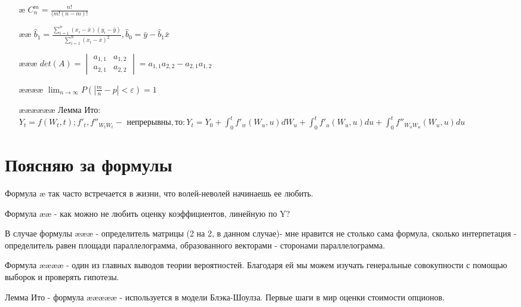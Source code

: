 \documentclass[11pt, a4paper]{article}
\begin{document}
\begin{enumerate}[label=\setcounter:{what's going on??}] 
\item [æ] $C_n^m=\frac{n!}{(m!(n-m)!}$ \label{f1}

\item [ææ] $\hat{b}_1=\frac{\displaystyle\sum_{i=1}^n (x_i-\bar{x})(y_i-\bar{y})}{\displaystyle\sum_{i=1}^n  (x_i-\bar{x})^2}, \hat{b}_0=\bar{y}-\hat{b}_1\bar{x}$ \label{f2} 
\item [æææ] $det(A)=\begin{vmatrix}
 	a_{1,1} & a_{1,2} \\
 	a_{2,1} & a_{2,2}
\end{vmatrix} = a_{1,1}a_{2,2}-a_{2,1}a_{1,2}$ \label{f3}
\item [ææææ] $\lim_{n \to \infty} P(|\frac{m}{n}-p|<\varepsilon)=1$ \label{f4}
\item [ææææææ] Лемма Ито: $Y_t=f(W_t,t);  f'_t,f''_{W_tW_t} - \text{ непрерывны}, то: Y_t=Y_0+\int_0^t f'_w(W_u,u)dW_u + \int_0^t f'_u (W_u,u)du + \int_0^t f''_{W_uW_u}(W_u,u) du$\label{f5}

\end{enumerate}


\section{Поясняю за формулы}

Формула æ так часто встречается в жизни, что волей-неволей начинаешь ее любить.

Формула ææ - как можно не любить оценку коэффициентов, линейную по Y?  

В случае формулы æææ - определитель матрицы (2 на 2, в данном случае)- мне нравится не столько сама формула, сколько интерпетация - определитель равен площади параллелограмма, образованного векторами - сторонами параллелограмма. 

Формула ææææ - один из главных выводов теории вероятностей. Благодаря ей мы можем изучать генеральные совокупности с помощью выборок и проверять гипотезы.

Лемма Ито - формула æææææ - используется в модели Блэка-Шоулза. Первые шаги в мир оценки стоимости опционов.
\end{document}
